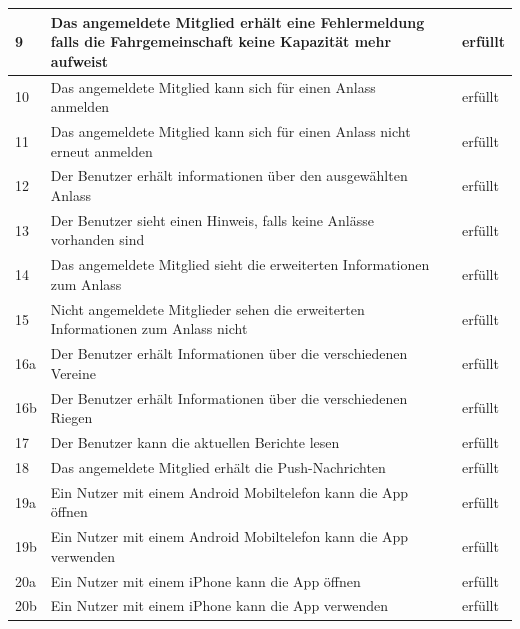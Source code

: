 \begin{longtable}{ l | p{7cm} | l | l }
	9	&	Das angemeldete Mitglied erhält eine Fehlermeldung falls die Fahrgemeinschaft keine Kapazität mehr aufweist
				&	\nameref{table:req_4} 	&	erfüllt\\ \hline
	10	&	Das angemeldete Mitglied kann sich für einen Anlass anmelden
				&	\nameref{table:req_5} 	&	erfüllt\\ \hline
	11	&	Das angemeldete Mitglied kann sich für einen Anlass nicht erneut anmelden
				&	\nameref{table:req_5} 	&	erfüllt\\ \hline
	12	&	Der Benutzer erhält informationen über den ausgewählten Anlass
				&	\nameref{table:req_6} 	&	erfüllt\\ \hline
	13	&	Der Benutzer sieht einen Hinweis, falls keine Anlässe vorhanden sind
				&	\nameref{table:req_6} 	&	erfüllt\\ \hline
	14	&	Das angemeldete Mitglied sieht die erweiterten Informationen zum Anlass
				&	\nameref{table:req_7} 	&	erfüllt\\ \hline
	15	&	Nicht angemeldete Mitglieder sehen die erweiterten Informationen zum Anlass nicht
				&	\nameref{table:req_7} 	&	erfüllt\\ \hline
	16a	&	Der Benutzer erhält Informationen über die verschiedenen Vereine
				&	\nameref{table:req_8} 	&	erfüllt\\ \hline
	16b	&	Der Benutzer erhält Informationen über die verschiedenen Riegen
				&	\nameref{table:req_8} 	&	erfüllt\\ \hline
	17	&	Der Benutzer kann die aktuellen Berichte lesen
				&	\nameref{table:req_9} 	&	erfüllt\\ \hline
	18	&	Das angemeldete Mitglied erhält die Push-Nachrichten
				&	\nameref{table:req_10} 	&	erfüllt\\ \hline
	19a	&	Ein Nutzer mit einem Android Mobiltelefon kann die App öffnen
				&	\nameref{table:req_nf_1} 	&	erfüllt\\ \hline
	19b	&	Ein Nutzer mit einem Android Mobiltelefon kann die App verwenden
				&	\nameref{table:req_nf_1} 	&	erfüllt\\ \hline
	20a	&	Ein Nutzer mit einem iPhone kann die App öffnen
				&	\nameref{table:req_nf_2} 	&	erfüllt\\ \hline
	20b	&	Ein Nutzer mit einem iPhone kann die App verwenden
				&	\nameref{table:req_nf_2} 	&	erfüllt

\end{longtable}

\newpage
